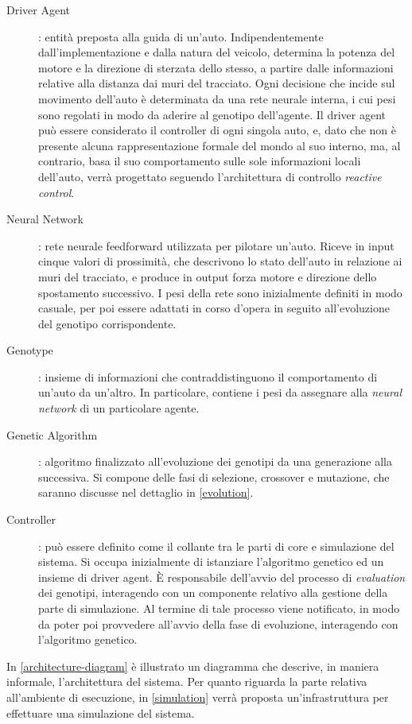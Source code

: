 \documentclass[a4paper,12pt]{article}
\begin{document}
\begin{description}
	\item[Driver Agent]: entità preposta alla guida di un'auto. Indipendentemente dall'implementazione e dalla natura del veicolo, determina la potenza del motore e la direzione di sterzata dello stesso, a partire dalle informazioni relative alla distanza dai muri del tracciato. Ogni decisione che incide sul movimento dell'auto è determinata da una rete neurale interna, i cui pesi sono regolati in modo da aderire al genotipo dell'agente. Il driver agent può essere considerato il controller di ogni singola auto, e, dato che non è presente alcuna rappresentazione formale del mondo al suo interno, ma, al contrario, basa il suo comportamento sulle sole informazioni locali dell'auto, verrà progettato seguendo l'architettura di controllo \emph{reactive control}. 
	\item[Neural Network]: rete neurale feedforward utilizzata per pilotare un'auto. Riceve in input cinque valori di prossimità, che descrivono lo stato dell'auto in relazione ai muri del tracciato, e produce in output forza motore e direzione dello spostamento successivo. I pesi della rete sono inizialmente definiti in modo casuale, per poi essere adattati in corso d'opera in seguito all'evoluzione del genotipo corrispondente.
	\item[Genotype]: insieme di informazioni che contraddistinguono il comportamento di un'auto da un'altro. In particolare, contiene i pesi da assegnare alla \emph{neural network} di un particolare agente.
	\item[Genetic Algorithm]: algoritmo finalizzato all'evoluzione dei genotipi da una generazione alla successiva. Si compone delle fasi di selezione, crossover e mutazione, che saranno discusse nel dettaglio in \autoref{evolution}.
	\item[Controller]: può essere definito come il collante tra le parti di core e simulazione del sistema. Si occupa inizialmente di istanziare l'algoritmo genetico ed un insieme di driver agent. È responsabile dell'avvio del processo di \emph{evaluation} dei genotipi, interagendo con un componente relativo alla gestione della parte di simulazione. Al termine di tale processo viene notificato, in modo da poter poi provvedere all'avvio della fase di evoluzione, interagendo con l'algoritmo genetico.
\end{description}
In \autoref{architecture-diagram} è illustrato un diagramma che descrive, in maniera informale, l'architettura del sistema. Per quanto riguarda la parte relativa all'ambiente di esecuzione, in \autoref{simulation} verrà proposta un'infrastruttura per effettuare una simulazione del sistema.
\end{document}
